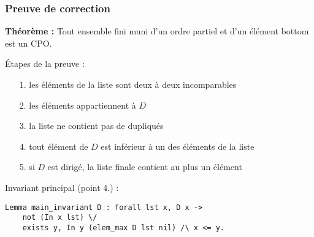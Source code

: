 \documentclass{beamer}
\begin{document}
\begin{frame}
{\begin{figure}[ht]
{
	}
\end{figure}
}

   
\end{frame}

\begin{frame}[fragile]
\frametitle{Preuve de correction}

\textbf{Théorème :} Tout ensemble fini muni d'un ordre partiel et d'un élément bottom est un CPO.

\medskip

Étapes de la preuve :

\begin{itemize}
\item[1.] les éléments de la liste sont deux à deux incomparables
\item[2.] les éléments appartiennent à $D$
\item[3.] la liste ne contient pas de dupliqués
\item[4.] tout élément de $D$ est inférieur à un des éléments de la liste 
\item[5.] si $D$ est dirigé, la liste finale contient au plus un élément
\end{itemize}

\medskip

Invariant principal (point 4.) :

\begin{lstlisting}[frame=single, language = Coq, basicstyle=\scriptsize]
Lemma main_invariant D : forall lst x, D x -> 
	not (In x lst) \/ 
	exists y, In y (elem_max D lst nil) /\ x <= y.
\end{lstlisting}

\end{frame}
\end{document}
